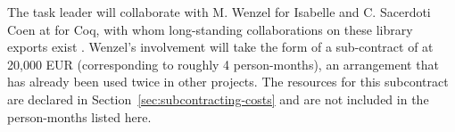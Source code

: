 \begin{workpackage}[id=structuring,type=RTD,
  short={Structure of the encyclopedia},%
  title={Structure of the encyclopedia},
  lead=Sac,
  SacRM=40,
  FauRM=20,
  BolRM=4
]
\begin{tasklist}
\begin{task}[id=strontorepml,title=Ontological Representation of Formal Libraries,lead=Fau,FauRM=6,BolRM=4,SacRM=4,wphases=12-48!.5]
The task leader will collaborate with M. Wenzel for Isabelle and C. Sacerdoti Coen at  for Coq, with whom long-standing collaborations on these library exports exist \cite{MRS:coq:19,CKMRSW:ulo:19,KRW:isabelle:19}.
Wenzel's involvement will take the form of a sub-contract of  at 20,000 EUR (corresponding to roughly 4 person-months), an arrangement that has already been used twice in other projects.
The resources for this subcontract are declared in Section~\ref{sec:subcontracting-costs} and are not included in the person-months listed here.
\end{task}




\end{tasklist}



\end{workpackage}
